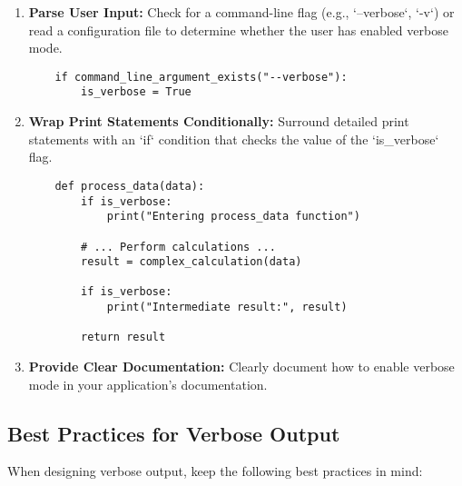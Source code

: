 \documentclass{article}
\begin{document}
{{{\begin{enumerate}
    \item \textbf{Parse User Input:}  Check for a command-line flag (e.g., `--verbose`, `-v`) or read a configuration file to determine whether the user has enabled verbose mode.
    \begin{verbatim}
    if command_line_argument_exists("--verbose"):
        is_verbose = True
    \end{verbatim}

    \item \textbf{Wrap Print Statements Conditionally:}  Surround detailed print statements with an `if` condition that checks the value of the `is_verbose` flag.
    \begin{verbatim}
    def process_data(data):
        if is_verbose:
            print("Entering process_data function")

        # ... Perform calculations ...
        result = complex_calculation(data)

        if is_verbose:
            print("Intermediate result:", result)

        return result
    \end{verbatim}

    \item \textbf{Provide Clear Documentation:}  Clearly document how to enable verbose mode in your application's documentation.

\end{enumerate}

\subsection*{Best Practices for Verbose Output}

When designing verbose output, keep the following best practices in mind:

}}}
\end{document}
